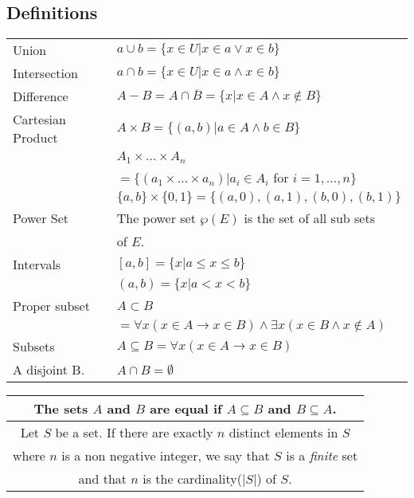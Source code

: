 \documentclass[5pt]{article}
\begin{document}
\begin{multicols}{2}
\subsection{Definitions}
\begin{tabular}{ll}
    Union             & $a\cup b=\{x\in U|x\in a\lor x\in b\}$  \\
    Intersection      & $a\cap b=\{x\in U|x\in a\land x\in b\}$ \\
    Difference        & $A-B=A\cap\overline{B}=\{x|x\in A\land x\notin B\}$\\
    Cartesian Product & $A\times B=\{(a,b)|a\in A\land b\in B\}$\\
                      & $A_1\times ...\times A_n$\\
                      & $=\{(a_1\times ...\times a_n)|a_i\in A_i$ for $i=1,...,n\}$\\
                      & $\{a,b\}\times \{0,1\}=\{(a,0),(a,1),(b,0),(b,1)\}$\\
                      
    Power Set         & The power set $\wp(E)$ is the set of all sub sets\\
                      & of $E.$\\
    Intervals         & $[a,b]=\{x|a\leq x\leq b\}$\\
                      & $(a,b)=\{x|a< x< b\}$\\
    Proper subset     & $A \subset B$\\
                      & $=\forall x(x\in A \rightarrow x\in B)\land\exists x(x\in B \land x\notin A)$\\
    Subsets           & $A \subseteq B=\forall x(x\in A \rightarrow x\in B)$\\
    A disjoint B.     & $A\cap B=\emptyset$\\
\end{tabular}
\begin{tabular}{c}
    \hline
    The sets $A$ and $B$ are equal if $A \subseteq B$ and $B \subseteq A$.\\
    \hline
    Let $S$ be a set. If there are exactly $n$ distinct elements in $S$\\ where $n$ is a non negative integer, we say that $S$ is a \textit{finite} set\\ and that $n$ is the cardinality($|S|$) of $S$.
\end{tabular}


\end{multicols}
\end{document}

